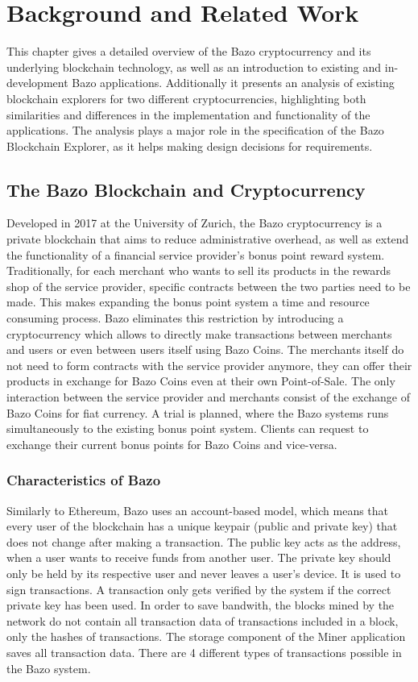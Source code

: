 \chapter{Background and Related Work}
This chapter gives a detailed overview of the Bazo cryptocurrency and its underlying blockchain technology, as well as an introduction to existing and in-development Bazo applications. Additionally it presents an analysis of existing blockchain explorers for two different cryptocurrencies, highlighting both similarities and differences in the implementation and functionality of the applications. The analysis plays a major role in the specification of the Bazo Blockchain Explorer, as it helps making design decisions for requirements.

\section{The Bazo Blockchain and Cryptocurrency}
Developed in 2017 at the University of Zurich, the Bazo cryptocurrency is a private blockchain that aims to reduce administrative overhead, as well as extend the functionality of a financial service provider's bonus point reward system. Traditionally, for each merchant who wants to sell its products in the rewards shop of the service provider, specific contracts between the two parties need to be made. This makes expanding the bonus point system a time and resource consuming process. Bazo eliminates this restriction by introducing a cryptocurrency which allows to directly make transactions between merchants and users or even between users itself using Bazo Coins. The merchants itself do not need to form contracts with the service provider anymore, they can offer their products in exchange for Bazo Coins even at their own Point-of-Sale. The only interaction between the service provider and merchants consist of the exchange of Bazo Coins for fiat currency. A trial is planned, where the Bazo systems runs simultaneously to the existing bonus point system. Clients can request to exchange their current bonus points for Bazo Coins and vice-versa.

\subsection{Characteristics of Bazo}
Similarly to Ethereum, Bazo uses an account-based model, which means that every user of the blockchain has a unique keypair (public and private key) that does not change after making a transaction. The public key acts as the address, when a user wants to receive funds from another user. The private key should only be held by its respective user and never leaves a user's device. It is used to sign transactions. A transaction only gets verified by the system if the correct private key has been used. In order to save bandwith, the blocks mined by the network do not contain all transaction data of transactions included in a block, only the hashes of transactions. The storage component of the Miner application saves all transaction data. There are 4 different types of transactions possible in the Bazo system.


